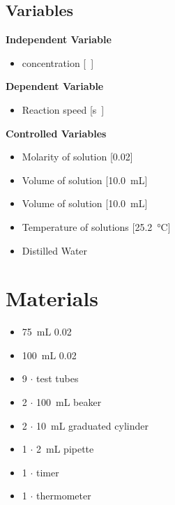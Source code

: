 \documentclass[a4paper]{article}
\begin{document}
        \subsection{Variables}
            \textbf{Independent Variable}
            \begin{itemize}
                \item {} concentration [\si\Molar]
            \end{itemize}
            \textbf{Dependent Variable}
            \begin{itemize}
                \item Reaction speed [\si\s]
            \end{itemize}
            \textbf{Controlled Variables}
            \begin{itemize}
                \item Molarity of  solution [\SI{0.02}{\Molar}]
                \item Volume of  solution [\SI{10.0}{\mL}]
                \item Volume of  solution [\SI{10.0}{\mL}]
                \item Temperature of solutions [\SI{25.2}{\celsius}]
                \item Distilled Water
            \end{itemize}
    \section{Materials}
        \begin{itemize}
            \item \SI{75}{\mL} \SI{0.02}{\Molar} 
            \item \SI{100}{\mL} \SI{0.02}{\Molar} 
            \item 9 $\cdot$ test tubes
            \item 2 $\cdot$ \SI{100}{\mL} beaker
            \item 2 $\cdot$ \SI{10}{\mL} graduated cylinder
            \item 1 $\cdot$ \SI{2}{\mL} pipette
            \item 1 $\cdot$ timer
            \item 1 $\cdot$ thermometer
        \end{itemize}
\end{document}
